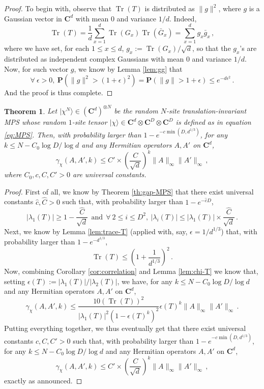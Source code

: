 \documentclass{amsart}
\newtheorem{theorem}{Theorem}[section]
\newcommand{\C}{\mathbf{C}}
\renewcommand{\P}{\mathbf{P}}
\renewcommand{\leq}{\leqslant}
\renewcommand{\geq}{\geqslant}
\DeclareMathOperator{\Tr}{Tr}
\newcommand{\ket}[1]{| #1 \rangle}
\begin{document}
\begin{proof}
    To begin with, observe that $\Tr(T)$ is distributed as $\|g\|^2$, where $g$ is a Gaussian vector in $\C^d$ with mean $0$ and variance $1/d$. Indeed,
    \[ \Tr(T) = \frac{1}{d} \sum_{x=1}^d \Tr(G_x)\Tr(\bar{G}_x) = \sum_{x=1}^d g_x\bar{g}_x \, , \]
    where we have set, for each $1\leq x\leq d$, $g_x:=\Tr(G_x)/\sqrt{d}$, so that the $g_x$'s are distributed as independent complex Gaussians with mean $0$ and variance $1/d$. Now, for such vector $g$, we know by Lemma \ref{lem:gg} that
    \[ \forall\ \epsilon>0,\ \P\left( \|g\|^2 > (1+\epsilon)^2 \right) = \P\left( \|g\| > 1+\epsilon \right) \leq e^{-d\epsilon^2} \, . \]
    And the proof is thus complete.
\end{proof}

\begin{theorem} \label{th:dc2-MPS}
    Let $\ket{\chi^{N}}\in(\C^d)^{\otimes N}$ be the random $N$-site translation-invariant MPS whose random $1$-site tensor $\ket{\chi}\in\C^d\otimes\C^D\otimes\C^D$ is defined as in equation \eqref{eq:MPS}. Then, with probability larger than $1-e^{-c\min(D,d^{1/3})}$, for any $k\leq N-C_0\log D/\log d$ and any Hermitian operators $A,A'$ on $\C^d$,
    \[ \gamma_{\chi}(A,A',k) \leq C'\times\left(\frac{C}{\sqrt{d}}\right)^k\|A\|_{\infty}\|A'\|_{\infty} \, , \]
    where $C_0,c,C,C'>0$ are universal constants.
\end{theorem}

\begin{proof}
    First of all, we know by Theorem \ref{th:gap-MPS} that there exist universal constants $\hat{c},\hat{C}>0$ such that, with probability larger than $1-e^{-\hat{c}D}$,
    \[ |\lambda_1(T)|  \geq 1-\frac{\hat{C}}{\sqrt{d}}\ \ \text{and}\ \ \forall\ 2\leq i\leq D^2,\ |\lambda_i(T)| \leq |\lambda_1(T)|\times \frac{\hat{C}}{\sqrt{d}} \, . \]
    Next, we know by Lemma \ref{lem:trace-T} (applied with, say, $\epsilon=1/d^{1/3}$) that, with probability larger than $1-e^{-d^{1/3}}$,
    \[ \Tr(T)\leq \left(1+\frac{1}{d^{1/3}}\right)^2 \, . \]
    Now, combining Corollary \ref{cor:correlation} and Lemma \ref{lem:chi-T} we know that, setting $\epsilon(T):=|\lambda_1(T)|/|\lambda_2(T)|$, we have, for any $k\leq N-C_0\log D/\log d$ and any Hermitian operators $A,A'$ on $\C^d$,
    \[ \gamma_{\chi}(A,A',k) \leq \frac{10(\Tr(T))^2}{|\lambda_1(T)|^2\left(1-\epsilon(T)^k\right)^2} \epsilon(T)^k \|A\|_{\infty}\|A'\|_{\infty} \, .\]
    Putting everything together, we thus eventually get that there exist universal constants $c,C, C'>0$ such that, with probability larger than $1-e^{-c\min(D,d^{1/3})}$, for any $k\leq N-C_0\log D/\log d$ and any Hermitian operators $A,A'$ on $\C^d$,
    \[ \gamma_{\chi}(A,A',k) \leq C'\times\left(\frac{C}{\sqrt{d}}\right)^k\|A\|_{\infty}\|A'\|_{\infty} \, ,\]
    exactly as announced.
\end{proof}
\end{document}
